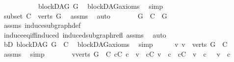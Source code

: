 \begin{isabellebody}
\ \ \isamarkupfalse%
\ \ \isanewline
\ \ \ \ \isamarkupfalse%
\ {\isachardoublequoteopen}blockDAG\ G{\isachardoublequoteclose}\ \isamarkupfalse%
\ blockDAG{\isacharunderscore}{\kern0pt}axioms\ \isamarkupfalse%
\ simp\isanewline
\ \ \isamarkupfalse%
\ \isanewline
\ \ \ \ \isamarkupfalse%
\ subset{\isacharcolon}{\kern0pt}\ {\isachardoublequoteopen}C\ {\isasymsubseteq}\ verts\ G{\isachardoublequoteclose}\ \isamarkupfalse%
\ assms\ \isamarkupfalse%
\ auto\isanewline
\ \ \ \ \isamarkupfalse%
\ \isamarkupfalse%
\ {\isachardoublequoteopen}G\ {\isasymrestriction}\ C\ {\isacharequal}{\kern0pt}\ G{\isachardoublequoteclose}\ \isamarkupfalse%
\ assms\ induce{\isacharunderscore}{\kern0pt}subgraph{\isacharunderscore}{\kern0pt}def\isanewline
\ \ \ \ \ \ \isamarkupfalse%
\ induce{\isacharunderscore}{\kern0pt}eq{\isacharunderscore}{\kern0pt}iff{\isacharunderscore}{\kern0pt}induced\ induced{\isacharunderscore}{\kern0pt}subgraph{\isacharunderscore}{\kern0pt}refl\ assms\ \isamarkupfalse%
\ auto\ \isanewline
\ \ \ \ \isamarkupfalse%
\ \isamarkupfalse%
\ bD{\isacharcolon}{\kern0pt}\ {\isachardoublequoteopen}blockDAG\ {\isacharparenleft}{\kern0pt}G\ {\isasymrestriction}\ C{\isacharparenright}{\kern0pt}{\isachardoublequoteclose}\ \isamarkupfalse%
\ blockDAG{\isacharunderscore}{\kern0pt}axioms\ \isamarkupfalse%
\ simp\isanewline
\ \ \ \ \isamarkupfalse%
\ {\isachardoublequoteopen}{\isasymnexists}v{\isachardot}{\kern0pt}\ v\ {\isasymin}\ {\isacharparenleft}{\kern0pt}verts\ G{\isacharparenright}{\kern0pt}\ {\isacharminus}{\kern0pt}\ C{\isachardoublequoteclose}\ \isamarkupfalse%
\ assms\ \isamarkupfalse%
\ simp\isanewline
\ \ \ \ \isamarkupfalse%
\ \isamarkupfalse%
\ {\isachardoublequoteopen}{\isacharparenleft}{\kern0pt}{\isasymforall}v{\isasymin}verts\ G\ {\isacharminus}{\kern0pt}\ C{\isachardot}{\kern0pt}\ {\isacharparenleft}{\kern0pt}{\isasymforall}c{\isasymin}C{\isachardot}{\kern0pt}\ c\ {\isasymrightarrow}\isactrlsup {\isacharasterisk}{\kern0pt}\ v{\isacharparenright}{\kern0pt}\ {\isasymor}\ {\isacharparenleft}{\kern0pt}{\isasymforall}c{\isasymin}C{\isachardot}{\kern0pt}\ v\ {\isasymrightarrow}\isactrlsup {\isacharasterisk}{\kern0pt}\ c{\isacharparenright}{\kern0pt}\ {\isasymor}\ {\isacharparenleft}{\kern0pt}{\isasymforall}c{\isasymin}C{\isachardot}{\kern0pt}\ {\isasymnot}\ v\ {\isasymrightarrow}\isactrlsup {\isacharasterisk}{\kern0pt}\ c\ {\isasymand}\ {\isasymnot}\ v\ {\isasymrightarrow}\isactrlsup {\isacharasterisk}{\kern0pt}\ c{\isacharparenright}{\kern0pt}{\isacharparenright}{\kern0pt}{\isachardoublequoteclose}\isanewline

\end{isabellebody}
